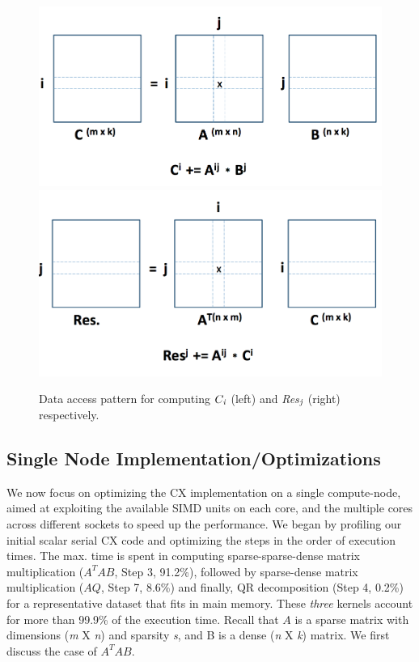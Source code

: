      \begin{figure}[htp]
         \includegraphics[scale=0.254]{images/jatin_a}
         \includegraphics[scale=0.254]{images/jatin_b}
         \caption{ Data access pattern for computing ${C}_{\it{i}}$ (left) and {\it{Res}}$_{\it{j}}$ (right) respectively.}
         \label{fig:access_pattern}
           \end{figure}


\subsection {Single Node Implementation/Optimizations}
\label{sxn:single_node_opt}

    We now focus on optimizing the CX implementation on a single
    compute-node, aimed at exploiting the available SIMD units on each
    core, and the multiple cores across different sockets to speed up the performance. 
    We began by profiling our initial %
    scalar serial CX
    code and optimizing the steps in the order of execution times.
    The max. time is spent in computing sparse-sparse-dense matrix
    multiplication ($A^TAB$, Step 3, 91.2\%), followed by  sparse-dense matrix
    multiplication ($AQ$, Step 7, 8.6\%) and finally, QR
    decomposition (Step 4, 0.2\%)
    for a representative dataset that fits in main memory. These
    {\it{three}} kernels account for more than 99.9\% of
    the execution time.
    Recall that $A$ is a sparse matrix with dimensions ({\it{m}} X
    {\it{n}}) and sparsity {\it{s}}, and B is a dense ({\it{n}} X {\it{k}}) matrix.
    We first discuss the case of $A^TAB$.

